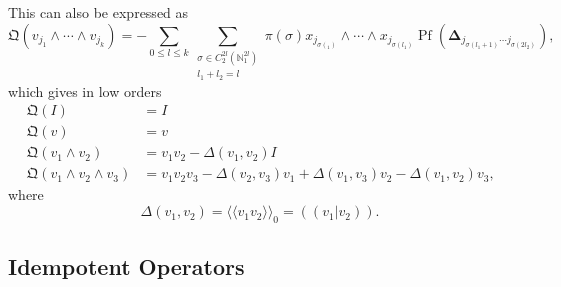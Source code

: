 \documentclass[aps, preprint]{revtex4}
\begin{document}
This can also be expressed as
\begin{equation}\mathfrak{Q} \left (v_{j_{1}} \wedge \cdots  \wedge v_{j_{k}}\right ) = -{\displaystyle\sum _{0 \leq l \leq k}}{\displaystyle\sum _{\begin{array}{c}\sigma  \in C_{2}^{2 l} \left (\mathbb{N}_{1}^{2 l}\right ) \\
l_{1} +l_{2} =l\end{array}}}\pi  \left (\sigma \right ) x_{j_{\sigma  \left (_{1}\right )}} \wedge \cdots  \wedge x_{j_{\sigma  \left (l_{1}\right )}} \ensuremath{\operatorname*{Pf}} \left (\mathbf{\Delta }_{j_{\sigma  \left (l_{1} +1\right )} \cdots  j_{\sigma  \left (2 l_{2}\right )}}\right )\text{,}
\end{equation}which gives in low orders
\begin{align}\mathfrak{Q} \left (I\right ) &  =I \\
\mathfrak{Q} \left (v\right ) &  =v \\
\mathfrak{Q} \left (v_{1} \wedge v_{2}\right ) &  =v_{1} v_{2} - \Delta \left (v_{1} ,v_{2}\right ) I \\
\mathfrak{Q} \left (v_{1} \wedge v_{2} \wedge v_{3}\right ) &  =v_{1} v_{2} v_{3} - \Delta \left (v_{2} ,v_{3}\right ) v_{1} + \Delta \left (v_{1} ,v_{3}\right ) v_{2} - \Delta \left (v_{1} ,v_{2}\right ) v_{3}\text{,}\end{align}where
\begin{equation} \Delta \left (v_{1} ,v_{2}\right ) = \langle  \langle v_{1} v_{2} \rangle  \rangle _{0} =\left (\left (\left .v_{1}\right \vert v_{2}\right )\right )\text{.}
\end{equation}

\subsection{Idempotent Operators}
\end{document}
